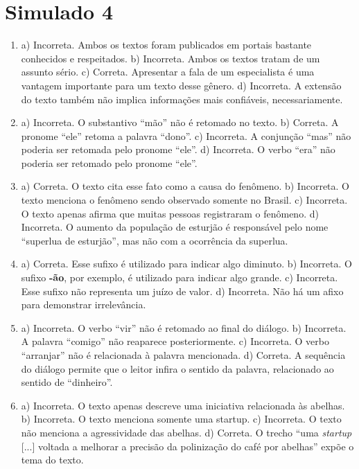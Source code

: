 \section*{Simulado 4}

\begin{enumerate}

\item
a) Incorreta. Ambos os textos foram publicados em portais bastante conhecidos e respeitados.
b) Incorreta. Ambos os textos tratam de um assunto sério.
c) Correta. Apresentar a fala de um especialista é uma vantagem importante para um texto desse gênero.
d) Incorreta. A extensão do texto também não implica informações mais confiáveis, necessariamente.

\item
a) Incorreta. O substantivo “mão” não é retomado no texto.
b) Correta. A pronome “ele” retoma a palavra “dono”.
c) Incorreta. A conjunção “mas” não poderia ser retomada pelo pronome “ele”.
d) Incorreta. O verbo “era” não poderia ser retomado pelo pronome “ele”.

\item
a) Correta. O texto cita esse fato como a causa do fenômeno.
b) Incorreta. O texto menciona o fenômeno sendo observado somente no Brasil.
c) Incorreta. O texto apenas afirma que muitas pessoas registraram o fenômeno.
d) Incorreta. O aumento da população de esturjão é responsável pelo nome “superlua de esturjão”, mas não com a ocorrência da superlua.

\item
a) Correta. Esse sufixo é utilizado para indicar algo diminuto.
b) Incorreta. O sufixo \textbf{-ão}, por exemplo, é utilizado para indicar algo grande.
c) Incorreta. Esse sufixo não representa um juízo de valor.
d) Incorreta. Não há um afixo para demonstrar irrelevância.

\item
a) Incorreta. O verbo “vir” não é retomado ao final do diálogo.
b) Incorreta. A palavra “comigo” não reaparece posteriormente.
c) Incorreta. O verbo “arranjar” não é relacionada à palavra mencionada.
d) Correta. A sequência do diálogo permite que o leitor infira o sentido da palavra, relacionado ao sentido de “dinheiro”.

\item
a) Incorreta. O texto apenas descreve uma iniciativa relacionada às abelhas.
b) Incorreta. O texto menciona somente uma startup.
c) Incorreta. O texto não menciona a agressividade das abelhas.
d) Correta. O trecho “uma \textit{startup} {[}...{]} voltada a melhorar a precisão da polinização do café por abelhas” expõe o tema do texto.


\end{enumerate}
